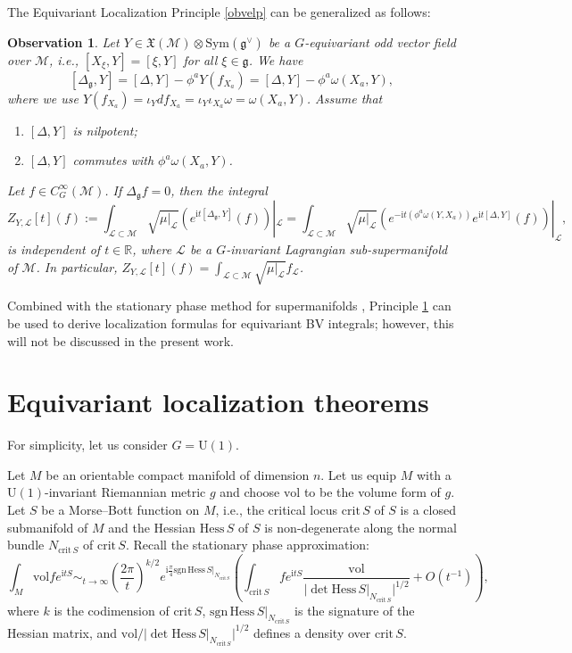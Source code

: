 \documentclass[12pt]{amsart}
\numberwithin{table}{section}
\numberwithin{equation}{section}
\newtheorem{obs}{Observation}[section]
\theoremstyle{plain}
\newcommand{\R}{\mathbb{R}}
\newcommand{\U}{\mathrm{U}}
\newcommand{\crit}{\mathrm{crit}\,}
\newcommand{\sM}{\mathcal{M}}
\newcommand{\sL}{\mathcal{L}}
\newcommand{\Hess}{\mathrm{Hess}\,}
\newcommand{\sgn}{\mathrm{sgn}\,}
\newcommand{\vol}{\mathrm{vol}}
\newcommand{\Sym}{\mathrm{Sym}}
\begin{document}
The Equivariant Localization Principle \ref{obvelp} can be generalized as follows:
\begin{obs}\label{obvelp2}
	Let $Y \in \mathfrak{X}(\sM) \otimes \Sym(\mathfrak{g}^{\vee})$ be a $G$-equivariant odd vector field over $\sM$, i.e., $[X_{\xi}, Y] = [\xi, Y]$ for all $\xi \in \mathfrak{g}$. We have
	\[
	[\Delta_{\mathfrak{g}}, Y] = [\Delta, Y] - \phi^a Y(f_{X_a}) = [\Delta, Y] - \phi^a \omega(X_a, Y),
	\]
	where we use $Y(f_{X_a}) = \iota_Y df_{X_a} = \iota_Y \iota_{X_a} \omega = \omega(X_a, Y)$. Assume that
	\begin{enumerate}
		\item $[\Delta,Y]$ is nilpotent;
		\item $[\Delta,Y]$ commutes with $\phi^a \omega(X_a, Y)$.
	\end{enumerate}
	Let $f \in C^{\infty}_G(\sM)$. If $\Delta_{\mathfrak{g}} f = 0$, then the integral
	\begin{equation}\label{bvelp2}
		Z_{Y, \sL}[t](f):= \int_{\mathcal{L} \subset \sM} \sqrt{\mu|_{\sL}} \left(e^{\mathrm{i}t[\Delta_{\mathfrak{g}}, Y]}(f)\right)|_{\sL} =  \int_{\mathcal{L} \subset \sM} \sqrt{\mu|_{\sL}} \left(e^{-\mathrm{i}t(\phi^a \omega(Y, X_a))}e^{\mathrm{i}t[\Delta,Y]}(f)\right)|_{\sL},
	\end{equation}
	is independent of $t \in \R$, where $\sL$ be a $G$-invariant Lagrangian sub-supermanifold of $\sM$. In particular, $Z_{Y,\sL}[t](f) = \int_{\mathcal{L} \subset \sM} \sqrt{\mu|_{\sL}}  f_{\sL}$.
\end{obs}

Combined with the stationary phase method for supermanifolds \cite[Theorem 4.2.2]{zakharevich2017localization}, Principle \ref{obvelp2} can be used to derive localization formulas for equivariant BV integrals; however, this will not be discussed in the present work.

\section{Equivariant localization theorems}

For simplicity, let us consider $G = \U(1)$. 

Let $M$ be an orientable compact manifold of dimension $n$. Let us equip $M$ with a $\mathrm{U}(1)$-invariant Riemannian metric $g$ and choose $\vol$ to be the volume form of $g$. Let $S$ be a Morse--Bott function on $M$, i.e., the critical locus $\crit S$ of $S$ is a closed submanifold of $M$ and the Hessian $\Hess S$ of $S$ is non-degenerate along the normal bundle $N_{\crit S}$ of $\crit S$. Recall the stationary phase approximation:
\[
\int_M \vol f e^{\mathrm{i}tS} \sim_{t \to \infty} \left(\frac{2\pi}{t}\right)^{k/2} e^{\mathrm{i}\frac{\pi}{4} \sgn \Hess S|_{N_{\crit S}}}\left( \int_{\crit S}  f e^{\mathrm{i}tS}  \frac{\vol}{|\det \Hess S |_{N_{\crit S}}|^{1/2}} + O(t^{-1})\right),
\]
where $k$ is the codimension of $\crit S$, $\sgn \Hess S|_{N_{\crit S}}$ is the signature of the Hessian matrix, and $\vol / |\det \Hess S |_{N_{\crit S}}|^{1/2}$ defines a density over $\crit S$.
\end{document}
